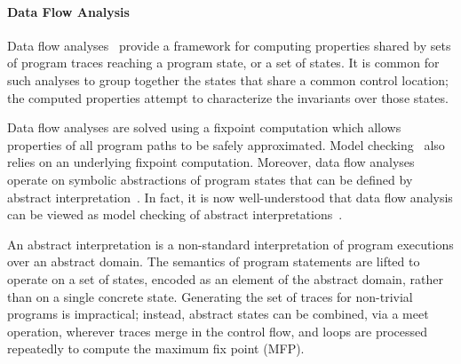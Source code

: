 \paragraph{Data Flow Analysis}
Data flow analyses~\cite{kildall1973unified} 
provide a framework for computing properties shared by sets of
program traces reaching a program state, or a set of states.  It is
common for such analyses to group together the states that share a
common control location; the computed properties attempt to characterize
the invariants over those states.

Data flow analyses are solved using a fixpoint computation which
allows properties of all program paths to be safely approximated.
Model checking~\cite{clarke1999model} also relies on an underlying
fixpoint computation.  Moreover, data flow
analyses operate on symbolic abstractions of program states that
can be defined by abstract interpretation~\cite{cousot1977abstract}. 
In fact, it is now well-understood that data flow analysis can be
viewed as model checking of abstract interpretations~\cite{schmidt1998data}.

An abstract interpretation is a 
non-standard interpretation of program executions over an abstract domain.  
The semantics of program statements are lifted to operate
on a set of states, encoded as an element of the abstract domain,
rather than on a single concrete state.  
Generating the set of traces for non-trivial programs is impractical;
instead, abstract states can be combined, via a meet operation, wherever
traces merge in the control flow, and loops are processed
repeatedly to compute the maximum fix point (MFP).


